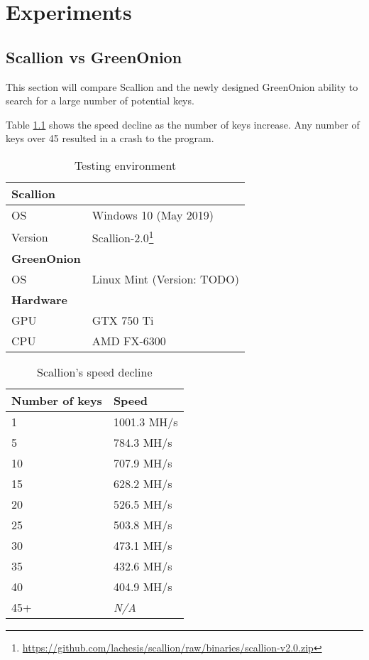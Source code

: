 \chapter{Experiments}
\label{cha:Experiments}

\section{Scallion vs GreenOnion}
This section will compare Scallion and the newly designed GreenOnion ability to search for a large number of potential keys.

Table \ref{tab:scallion_speed} shows the speed decline as the number of keys increase. Any number of keys over 45 resulted in a crash to the program.


\begin{table}[!h]
    \centering
    \begin{tabular}{|ll|}
        \hline
        \textbf{Scallion} & \\
        \hline
        OS & Windows 10 (May 2019) \\
        Version & Scallion-2.0\footnote{\url{https://github.com/lachesis/scallion/raw/binaries/scallion-v2.0.zip}} \\
        \hline
        \textbf{GreenOnion} & \\
        \hline
        OS & Linux Mint (Version: TODO) \\ 
        \hline
        \textbf{Hardware} & \\
        \hline
        GPU & GTX 750 Ti  \\
        CPU & AMD FX-6300 \\
        \hline
    \end{tabular}
    \caption{Testing environment}
\end{table}

\begin{table}[!h]
    \centering
    \begin{tabular}{|ll|}
        \hline
        \textbf{Number of keys} & \textbf{Speed} \\
        \hline
        1 & 1001.3 MH/s \\
        5 & 784.3 MH/s \\
        10 & 707.9 MH/s \\
        15 & 628.2 MH/s \\
        20 & 526.5 MH/s \\
        25 & 503.8 MH/s \\
        30 & 473.1 MH/s \\
        35 & 432.6 MH/s \\
        40 & 404.9 MH/s \\
        45+ & \textit{N/A} \\
        \hline
    \end{tabular}
    \caption{Scallion's speed decline}
    \label{tab:scallion_speed}
\end{table}

